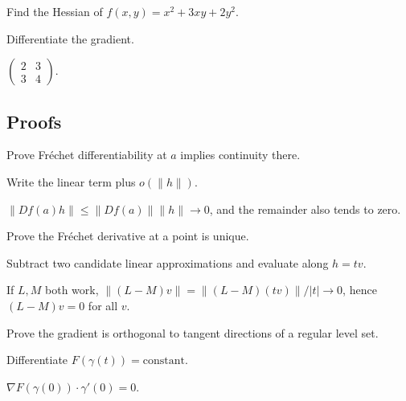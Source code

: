 \begin{exercise}[Hessian]\label{exr:ii08-expand-05}
Find the Hessian of \(f(x,y)=x^2+3xy+2y^2\).
\end{exercise}
\begin{hint}
Differentiate the gradient.
\end{hint}
\begin{solution}
\(\begin{pmatrix}2&3\\3&4\end{pmatrix}\).
\end{solution}

\subsection*{Proofs}

\begin{exercise}\label{exr:ii08-expand-06}
Prove Fréchet differentiability at \(a\) implies continuity there.
\end{exercise}
\begin{hint}
Write the linear term plus \(o(\|h\|)\).
\end{hint}
\begin{solution}
\(\|Df(a)h\|\le\|Df(a)\|\|h\|\to0\), and the remainder also tends to zero.
\end{solution}

\begin{exercise}\label{exr:ii08-expand-07}
Prove the Fréchet derivative at a point is unique.
\end{exercise}
\begin{hint}
Subtract two candidate linear approximations and evaluate along \(h=tv\).
\end{hint}
\begin{solution}
If \(L,M\) both work, \(\|(L-M)v\|=\|(L-M)(tv)\|/|t|\to0\), hence \((L-M)v=0\) for all \(v\).
\end{solution}

\begin{exercise}\label{exr:ii08-expand-08}
Prove the gradient is orthogonal to tangent directions of a regular level set.
\end{exercise}
\begin{hint}
Differentiate \(F(\gamma(t))=\text{constant}\).
\end{hint}
\begin{solution}
\(\nabla F(\gamma(0))\cdot\gamma'(0)=0\).
\end{solution}

